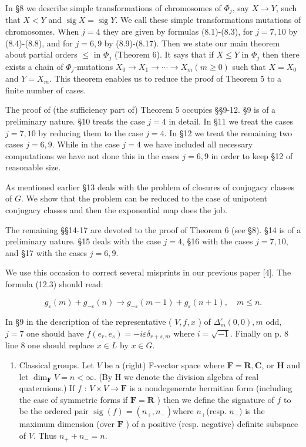\documentclass[10pt]{article}
\begin{document}
In §8 we describe simple transformations of chromosomes of $\Phi_{j}$, say $X \rightarrow Y$, such that $X<Y$ and $\operatorname{sig} X=\operatorname{sig} Y$. We call these simple transformations mutations of chromosomes. When $j=4$ they are given by formulas (8.1)-(8.3), for $j=7,10$ by (8.4)-(8.8), and for $j=6,9$ by (8.9)-(8.17). Then we state our main theorem about partial orders $\leqslant$ in $\Phi_{j}$ (Theorem 6). It says that if $X \leqslant Y$ in $\Phi_{j}$ then there exists a chain of $\Phi_{j}$-mutations $X_{0} \rightarrow X_{1} \rightarrow \cdots \rightarrow X_{m}(m \geqslant 0)$ such that $X=X_{0}$ and $Y=X_{m}$. This theorem enables us to reduce the proof of Theorem 5 to a finite number of cases.

The proof of (the sufficiency part of) Theorem 5 occupies §§9-12. §9 is of a preliminary nature. §10 treats the case $j=4$ in detail. In §11 we treat the cases $j=7,10$ by reducing them to the case $j=4$. In §12 we treat the remaining two cases $j=6,9$. While in the case $j=4$ we have included all necessary computations we have not done this in the cases $j=6,9$ in order to keep §12 of reasonable size.

As mentioned earlier §13 deals with the problem of closures of conjugacy classes of $G$. We show that the problem can be reduced to the case of unipotent conjugacy classes and then the exponential map does the job.

The remaining §§14-17 are devoted to the proof of Theorem 6 (see §8). §14 is of a preliminary nature. §15 deals with the case $j=4$, §16 with the cases $j=7,10$, and §17 with the cases $j=6,9$.

We use this occasion to correct several misprints in our previous paper [4]. The formula (12.3) should read:

$$
g_{\varepsilon}(m)+g_{-\varepsilon}(n) \rightarrow g_{-\varepsilon}(m-1)+g_{\varepsilon}(n+1), \quad m \leqslant n .
$$

In §9 in the description of the representative ( $V, f, x$ ) of $\Delta_{m}^{\varepsilon}(0,0), m$ odd, $j=7$ one should have $f\left(e_{r}, e_{s}\right)=-i \varepsilon \delta_{r+s, m}$ where $i=\sqrt{-1}$. Finally on p. 8 line 8 one should replace $x \in L$ by $x \in G$.

\begin{enumerate}
  \item Classical groups. Let $V$ be a (right) F-vector space where $\mathbf{F}=\mathbf{R}, \mathbf{C}$, or $\mathbf{H}$ and let $\operatorname{dim}_{\mathbf{F}} V=n<\infty$. (By H we denote the division algebra of real quaternions.) If $f$ : $V \times V \rightarrow \mathbf{F}$ is a nondegenerate hermitian form (including the case of symmetric forms if $\mathbf{F}=\mathbf{R}$ ) then we define the signature of $f$ to be the ordered pair $\operatorname{sig}(f)=\left(n_{+}, n_{-}\right)$where $n_{+}$(resp. $n_{-}$) is the maximum dimension (over $\mathbf{F}$ ) of a positive (resp. negative) definite subspace of $V$. Thus $n_{+}+n_{-}=n$.
\end{enumerate}
\end{document}
